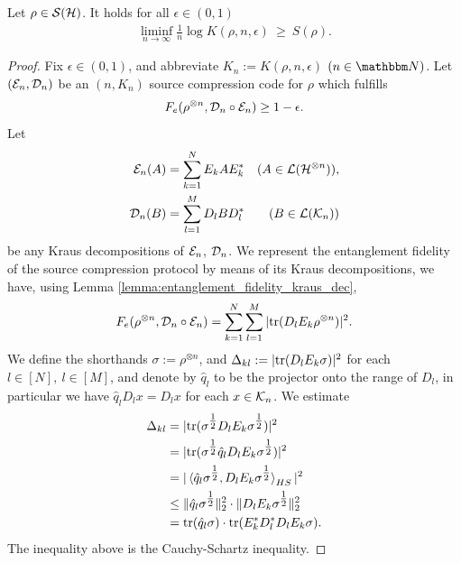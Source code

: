 \begin{proposition}
 Let $\rho \in {\mathcal S}({\mathcal H})$. It holds  for all $\epsilon \in (0,1)$
 \begin{align*}
  \underset{n \rightarrow \infty}{\liminf}\frac{1}{n} \log K(\rho, n, \epsilon) \ \geq \ S(\rho).
 \end{align*}
\end{proposition}

\begin{proof}
 Fix $\epsilon \in (0,1)$, and abbreviate $K_n := K(\rho, n, \epsilon)$ $(n \in \bbmN)$. Let $({\mathcal E}_n,{\mathcal D}_n)$ be 
 an $(n,K_n)$ source compression code for $\rho$ which fulfills
 \begin{align}
  F_e(\rho^{\otimes n}, {\mathcal D}_n \circ {\mathcal E}_n) \geq 1 - \epsilon.
 \end{align}
 Let 
 \begin{align*}
  {\mathcal E}_n(A) &= \sum_{k=1}^N E_k A E_k^\ast &(A \in {\mathcal L}({\mathcal H}^{\otimes n})), \\ 
  {\mathcal D}_n(B) &= \sum_{l=1}^M D_l B D_l^\ast &(B \in {\mathcal L}({\mathcal K}_n)) 
 \end{align*}
 be any Kraus decompositions of ${\mathcal E}_n$, ${\mathcal D}_n$. We represent the entanglement fidelity of the source compression protocol by means of its Kraus decompositions, we have,
 using Lemma \ref{lemma:entanglement_fidelity_kraus_dec},
 \begin{align} 
  F_e(\rho^{\otimes n}, {\mathcal D}_n \circ {\mathcal E}_n) = \sum_{k=1}^N \sum_{l=1}^M |\mathrm{tr}(D_lE_k\rho^{\otimes n}) |^2.
 \end{align}
 We define the shorthands $\sigma := \rho^{\otimes n}$, and 
$
  \Delta_{kl} := |\mathrm{tr}(D_l E_k \sigma)|^2
 $
 for each $l \in [N], \ l \in [M]$, and denote by $\hat{q}_l$ to be the projector onto the range of $D_l$, in particular we have $\hat{q}_l D_l x = D_l x $ for each $x \in {\mathcal K}_n$. 
 We estimate
 \begin{align*}
  \Delta_{kl} 
  &= | \mathrm{tr}(\sigma^{\tfrac{1}{2}} D_l E_k \sigma^{\tfrac{1}{2}}) |^2 \\
  &= | \mathrm{tr}(\sigma^{\tfrac{1}{2}} \hat{q}_lD_l E_k \sigma^{\tfrac{1}{2}}) |^2 \\
  &= | \braket{\hat{q}_l \sigma^{\tfrac{1}{2}}, D_l E_k \sigma^{\tfrac{1}{2}}}_{HS} |^2 \\
  &\leq \|\hat{q}_l \sigma^{\tfrac{1}{2}} \|_2^2 \cdot \|D_l E_k \sigma^{\tfrac{1}{2}}\|_2^2 \\
  & = \mathrm{tr}(\hat{q}_l\sigma) \cdot \mathrm{tr}(E_k^\ast D_l^\ast D_l E_k \sigma). 
 \end{align*}
 The inequality above is the Cauchy-Schartz inequality. 

\end{proof}
